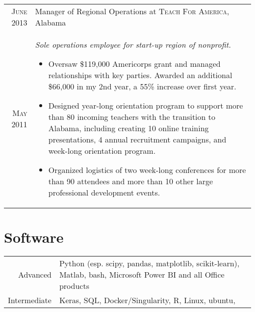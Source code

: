 \documentclass[a4paper,10pt]{article}
\begin{document}
\begin{longtable}{r|p{11cm}}
    \textsc{June} 2013 & Manager of Regional Operations at \textsc{Teach For America}, Alabama \\
    \textsc{May} 2011 & \emph{Sole operations employee for start-up region of nonprofit.}
    \footnotesize{
    \begin{itemize}
        \item{Oversaw \$119,000 Americorps grant and managed relationships with key parties. Awarded an additional \$66,000 in my 2nd year, a 55\% increase over first year.}
        \item Designed year-long orientation program to support more than 80 incoming teachers with the transition to Alabama, including creating 10 online training presentations, 4 annual recruitment campaigns, and week-long orientation program.
        \item Organized logistics of two week-long conferences for more than 90 attendees and more than 10 other large professional development events.
    \end{itemize}
    } \\
\end{longtable}


\section{Software}
\begin{longtable}{rp{11cm}}
    Advanced & Python (esp. scipy, pandas, matplotlib, scikit-learn), Matlab, bash, Microsoft Power BI and all Office products \\
    Intermediate & Keras, SQL, Docker/Singularity, R, Linux, ubuntu, \setmainfont[SmallCapsFont=Fontin-SmallCaps.otf]{Fontin.otf}\\
\end{longtable}
\end{document}
